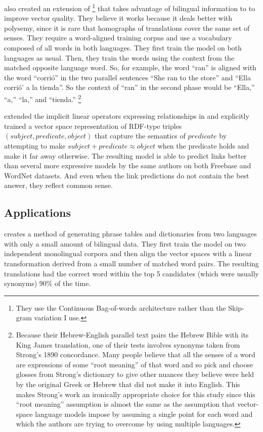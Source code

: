 \citep{Wolf} also created an extension of \modelname{}\footnote{They use the
Continuous Bag-of-words architecture rather than the Skip-gram variation I
use.} that takes advantage of
bilingual information to to improve vector quality. They believe it works 
because it deals better with polysemy, since it is rare that homographs of 
translations cover the same set of senses. They require a word-aligned 
training corpus and use a vocabulary 
composed of all words in both languages. They first train the model on both
languages as usual. Then, they train the words using the context from the 
matched opposite language word. So, for example, the word 
``ran'' is aligned with the word ``corri\'o'' in the two parallel sentences 
``She ran to the store'' and ``Ella corri\'o' a la tienda''. So the context of 
``ran'' in the second phase would be ``Ella,'' ``a,'' ``la,'' and ``tienda.''
\footnote{Because their Hebrew-English parallel text pairs the 
Hebrew Bible with its King James translation, one of their tests involves 
synonyms taken from Strong's 1890 
concordance. Many people believe that
all the senses of a word are expressions of some ``root meaning'' of that word 
and so
pick and choose glosses from Strong's dictionary to give other nuances they 
believe were held by the 
original Greek or Hebrew that did not make it into English. This makes 
Strong's work an ironically appropriate choice for this study 
since this ``root meaning'' assumption is almost the same as the assumption that 
vector-space language models impose by assuming a single point for each word 
and which the authors are trying to overcome by using multiple languages.}

\citep{Bordes2013} extended the implicit linear operators expressing 
relationships in \citep{Mikolov2013b} and explicitly trained a vector
space representation of RDF-type triples 
$(subject,predicate,object)$ that 
capture the semantics of $predicate$ by attempting to make 
$subject+predicate \approx object$ when the predicate holds and make it
far away otherwise. The resulting model is able to predict links better than
several more expressive models by the same authors on both Freebase and 
WordNet datasets. And even when the link predictions do not contain the best
answer, they reflect common sense.

\subsection{Applications}

\citep{Mikolov2013a} creates a method of generating phrase tables and 
dictionaries from two languages with only a small amount of bilingual data.
They first train the \modelname{} model on two independent monolingual corpora 
and then align the vector spaces with a linear transformation derived from a 
small number of matched word pairs. The resulting translations had the 
correct word within the top 5 candidates (which were usually synonyms) 90\% of 
the time.

